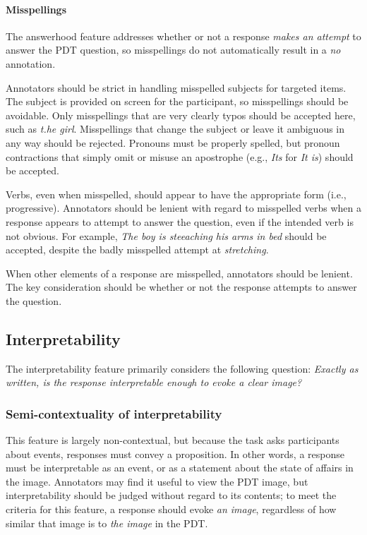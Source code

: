 \documentclass[12pt]{article}
\begin{document}
\paragraph{Misspellings}
\label{para:answerhood-misspellings}
The answerhood feature addresses whether or not a response \textit{makes an attempt} to answer the PDT question, so misspellings do not automatically result in a \textit{no} annotation. 

Annotators should be strict in handling misspelled subjects for targeted items. The subject is provided on screen for the participant, so misspellings should be avoidable. Only misspellings that are very clearly typos should be accepted here, such as \textit{t.he girl}. Misspellings that change the subject or leave it ambiguous in any way should be rejected. Pronouns must be properly spelled, but pronoun contractions that simply omit or misuse an apostrophe (e.g., \textit{Its} for \textit{It is}) should be accepted.

Verbs, even when misspelled, should appear to have the appropriate form (i.e., progressive). Annotators should be lenient with regard to misspelled verbs when a response appears to attempt to answer the question, even if the intended verb is not obvious. For example, \textit{The boy is steeaching his arms in bed} should be accepted, despite the badly misspelled attempt at \textit{stretching}.

When other elements of a response are misspelled, annotators should be lenient. The key consideration should be whether or not the response attempts to answer the question.

\subsection{Interpretability} \label{subsec:interpretability}
The interpretability feature primarily considers the following question: \textit{Exactly as written, is the response interpretable enough to evoke a clear image?} 

\subsubsection{Semi-contextuality of interpretability} \label{subsubsec:semicontext-interp} This feature is largely non-contextual, but because the task asks participants about events, responses must convey a proposition. In other words, a response must be interpretable as an event, or as a statement about the state of affairs in the image. Annotators may find it useful to view the PDT image, but interpretability should be judged without regard to its contents; to meet the criteria for this feature, a response should evoke \textit{an image}, regardless of how similar that image is to \textit{the image} in the PDT.
\end{document}

